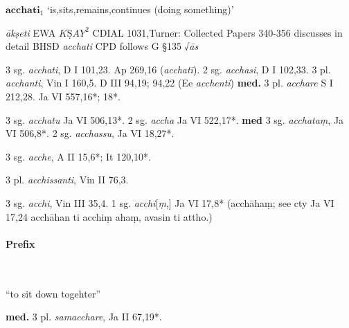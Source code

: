 \documentclass[11pt]{article}
\newcommand*\ṛ{r\symbol{"325}}
\newcommand*\Ṛ{R\symbol{"325}}
\newcommand*\ṝ{r\symbol{"304}\symbol{"325}}
\newcommand*\Ṝ{R\symbol{"304}\symbol{"325}}
\newcommand*\ḷ{l\symbol{"325}}
\newcommand*\ḹ{l\symbol{"304}\symbol{"325}}
\newcommand*\Ḷ{L\symbol{"325}}
\newcommand*\Ḹ{L\symbol{"304}\symbol{"325}}
\begin{document}
%
%
\begin{center}
{\Large
$\textbf{acchati}_1$ `is,sits,remains,continues (doing something)'
}
\end{center}

\begin{description}[leftmargin=\parindent]
\item[ety.]
\textit{ākṣeti}
EWA  $\textit{KṢAY}^2$
CDIAL 1031,Turner: Collected Papers 340-356 discusses in detail
BHSD \textit{acchati}
CPD follows G §135 √\textit{ās}
\end{description}
 
\begin{description}[leftmargin=\parindent]
\item[pres] 3 sg. \textit{acchati},  D I 101,23. Ap 269,16 (\textit{acchatī}). 2 sg. \textit{acchasi}, D I 102,33.
3 pl. \textit{acchanti}, Vin I 160,5. D III 94,19; 94,22 (Ee \textit{acchenti})
\textbf{med.} 3 pl. \textit{acchare} S I 212,28. Ja VI 557,16*; 18*.\\


\item[imper.]
3 sg. \textit{acchatu} Ja VI 506,13*.
2 sg. \textit{accha} Ja VI 522,17*.
\textbf{med} 3 sg. \textit{acchataṃ}, Ja VI 506,8*.
2 sg. \textit{acchassu}, Ja VI 18,27*.

\item[opt.]
3 sg. \textit{acche},
A II 15,6*; It 120,10*.

\item[fut.]
3 pl. \textit{acchissanti}, Vin II 76,3.

\item[pret.]
3 sg. \textit{acchi}, Vin III 35,4.
1 sg. \textit{acchi}[\textit{ṃ},] Ja VI 17,8* (acchāhaṃ; see cty Ja VI 17,24 acchāhan ti acchiṃ ahaṃ, avasin ti attho.)
\end{description}


\paragraph*{Prefix}\mbox{}\\
\begin{description}[leftmargin=\parindent]
\item[sam-] ``to sit down togehter''
	\begin{description}[leftmargin=\parindent]
	\item[pres] \textbf{med.} 3 pl.  \textit{samacchare}, Ja II 67,19*.
	\end{description}
\end{description}
\end{document}
